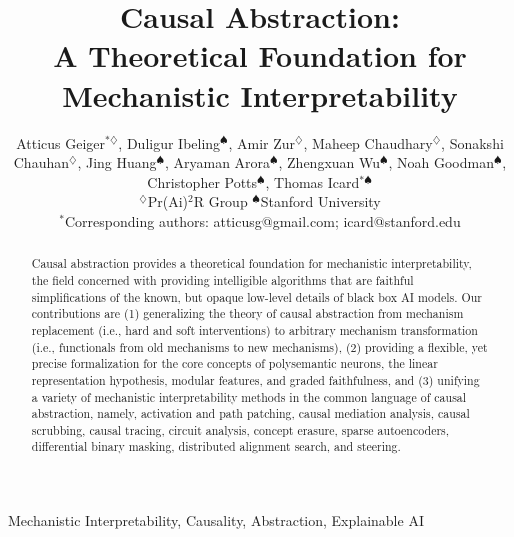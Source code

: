 \documentclass[twoside,11pt]{article}
\begin{document}
\title{Causal Abstraction: \\A Theoretical Foundation for Mechanistic Interpretability}

\author{Atticus Geiger$^{* \diamondsuit}$,
      Duligur Ibeling$^{\spadesuit}$,
      Amir Zur$^{\diamondsuit}$,
      Maheep Chaudhary$^{\diamondsuit}$,\AND
      Sonakshi Chauhan$^{\diamondsuit}$,
      Jing Huang$^{\spadesuit}$,
      Aryaman Arora$^{\spadesuit}$, 
      Zhengxuan Wu$^{\spadesuit}$,\AND
      Noah Goodman$^{\spadesuit}$,
      Christopher Potts$^{\spadesuit}$,
      Thomas Icard$^{* \spadesuit}$\\ \AND
  $^{\diamondsuit}$Pr(Ai)$^{2}$R Group \;\; $^{\spadesuit}$Stanford University\\ \AND
  $^*$Corresponding authors: atticusg@gmail.com;  icard@stanford.edu
  }


\maketitle

\begin{abstract}%
Causal abstraction provides a theoretical foundation for mechanistic interpretability, the field concerned with providing intelligible algorithms that are faithful simplifications of the known, but opaque low-level details of black box AI models. Our contributions are (1) generalizing the theory of causal abstraction from mechanism replacement (i.e., hard and soft interventions) to arbitrary mechanism transformation (i.e., functionals from old mechanisms to new mechanisms), (2) providing a flexible, yet precise formalization for the core concepts of polysemantic neurons, the linear representation hypothesis, modular features, and graded faithfulness, and (3) unifying a variety of mechanistic interpretability methods in the common language of causal abstraction, namely, activation and path patching, causal mediation analysis, causal scrubbing, causal tracing, circuit analysis, concept erasure, sparse autoencoders, differential binary masking, distributed alignment search, and steering.
\end{abstract}

\begin{keywords}
 Mechanistic Interpretability, Causality, Abstraction, Explainable AI
\end{keywords}
\newpage

\tableofcontents

\newcommand{\TODO}[1]{\textcolor{red}{#1}}
\end{document}
